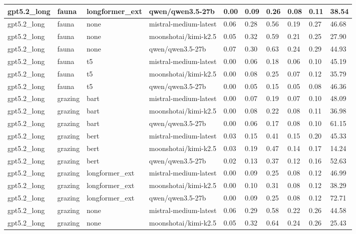 \begin{tabular}{|l|l|l|l|l|l|l|l|l|l|}
 \hline
 gpt5.2\_long & fauna & longformer\_ext & qwen/qwen3.5-27b & 0.00 & 0.09 & 0.26 & 0.08 & 0.11 & 38.54 \\
 \hline
 gpt5.2\_long & fauna & none & mistral-medium-latest & 0.06 & 0.28 & 0.56 & 0.19 & 0.27 & 46.68 \\
 \hline
 gpt5.2\_long & fauna & none & moonshotai/kimi-k2.5 & 0.05 & 0.32 & 0.59 & 0.21 & 0.25 & 27.90 \\
 \hline
 gpt5.2\_long & fauna & none & qwen/qwen3.5-27b & 0.07 & 0.30 & 0.63 & 0.24 & 0.29 & 44.93 \\
 \hline
 gpt5.2\_long & fauna & t5 & mistral-medium-latest & 0.00 & 0.06 & 0.18 & 0.06 & 0.10 & 45.19 \\
 \hline
 gpt5.2\_long & fauna & t5 & moonshotai/kimi-k2.5 & 0.00 & 0.08 & 0.25 & 0.07 & 0.12 & 35.79 \\
 \hline
 gpt5.2\_long & fauna & t5 & qwen/qwen3.5-27b & 0.00 & 0.05 & 0.15 & 0.05 & 0.08 & 46.36 \\
 \hline
 gpt5.2\_long & grazing & bart & mistral-medium-latest & 0.00 & 0.07 & 0.19 & 0.07 & 0.10 & 48.09 \\
 \hline
 gpt5.2\_long & grazing & bart & moonshotai/kimi-k2.5 & 0.00 & 0.08 & 0.22 & 0.08 & 0.11 & 36.98 \\
 \hline
 gpt5.2\_long & grazing & bart & qwen/qwen3.5-27b & 0.00 & 0.06 & 0.17 & 0.08 & 0.10 & 61.15 \\
 \hline
 gpt5.2\_long & grazing & bert & mistral-medium-latest & 0.03 & 0.15 & 0.41 & 0.15 & 0.20 & 45.33 \\
 \hline
 gpt5.2\_long & grazing & bert & moonshotai/kimi-k2.5 & 0.03 & 0.19 & 0.47 & 0.14 & 0.17 & 14.24 \\
 \hline
 gpt5.2\_long & grazing & bert & qwen/qwen3.5-27b & 0.02 & 0.13 & 0.37 & 0.12 & 0.16 & 52.63 \\
 \hline
 gpt5.2\_long & grazing & longformer\_ext & mistral-medium-latest & 0.00 & 0.09 & 0.25 & 0.08 & 0.12 & 46.99 \\
 \hline
 gpt5.2\_long & grazing & longformer\_ext & moonshotai/kimi-k2.5 & 0.00 & 0.10 & 0.31 & 0.08 & 0.12 & 38.29 \\
 \hline
 gpt5.2\_long & grazing & longformer\_ext & qwen/qwen3.5-27b & 0.00 & 0.09 & 0.25 & 0.08 & 0.12 & 72.71 \\
 \hline
 gpt5.2\_long & grazing & none & mistral-medium-latest & 0.06 & 0.29 & 0.58 & 0.22 & 0.26 & 44.58 \\
 \hline
 gpt5.2\_long & grazing & none & moonshotai/kimi-k2.5 & 0.05 & 0.32 & 0.64 & 0.24 & 0.26 & 25.43 \\

\end{tabular}
